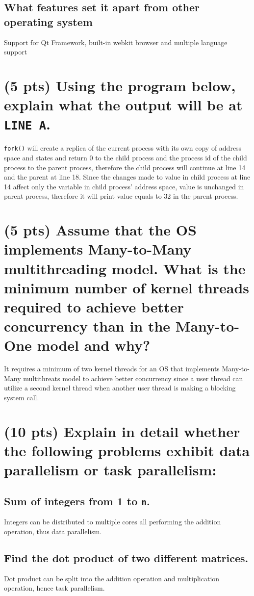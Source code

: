 \documentclass{article}
\begin{document}
\subsection{What features set it apart from other operating system}
Support for Qt Framework, built-in webkit browser and multiple language support

\newpage

\section{(5 pts) Using the program below, explain what the output will be at \texttt{LINE A}.}

\texttt{fork()} will create a replica of the current process with its own copy of address space and states and return 0 to the child process and the process id of the child process to the parent process, therefore the child process will continue at line 14 and the parent at line 18. Since the changes made to value in child process at line 14 affect only the variable in child process' address space, value is unchanged in parent process, therefore it will print value equals to 32 in the parent process. 


\section{(5 pts) Assume that the OS implements Many-to-Many multithreading model.  What is the minimum number of kernel threads required to achieve better concurrency than in the Many-to-One model and why?}
It requires a minimum of two kernel threads for an OS that implements Many-to-Many multithreats model to achieve better concurrency since a user thread can utilize a second kernel thread when another user thread is making a blocking system call.

\section{(10 pts) Explain in detail whether the following problems exhibit data parallelism or task parallelism:}
\subsection{Sum of integers from 1 to \texttt{n}.}
Integers can be distributed to multiple cores all performing the addition operation, thus data parallelism.

\subsection{Find the dot product of two different matrices.}
Dot product can be split into the addition operation and multiplication operation, hence task parallelism.
\end{document}
